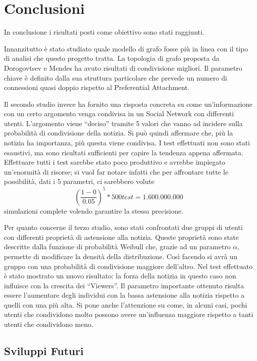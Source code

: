 \section{Conclusioni}
\label{section:conclusioni}

In conclusione i risultati posti come obiettivo sono stati raggiunti.

Innanzitutto è stato studiato quale modello di grafo fosse più in linea con il tipo di 
analisi che questo progetto tratta.
La topologia di grafo proposta da Dorogovtsev e Mendes ha avuto risultati di condivisione migliori. 
Il parametro chiave è definito dalla sua struttura particolare che 
prevede un numero di connessioni quasi doppio rispetto al Preferential Attachment.

Il secondo studio invece ha fornito una risposta concreta su come un'informazione con un certo argomento 
venga condivisa in un Social Network con differenti utenti.
L'argomento viene ``deciso'' tramite 5 valori che vanno ad incidere sulla probabilità di condivisione della notizia.
Si può quindi affermare che, più la notizia ha importanza, più questa viene condivisa.
I test effettuati non sono stati esaustivi, ma sono risultati sufficienti per capire la tendenza appena affermata.
Effettuare tutti i test sarebbe stato poco produttivo e avrebbe impiegato un'enormità di risorse;
si vuol far notare infatti che per affrontare tutte le possibilità, dati i 5 parametri, ci sarebbero volute
\[
  \left(\frac{1 - 0}{0.05}\right)^5 * 500 test = 1.600.000.000
\]
simulazioni complete volendo garantire la stessa precisione. 

Per quanto concerne il terzo studio, sono stati confrontati due gruppi di utenti con differenti 
proprietà di astensione alla notizia. Queste proprietà sono state descritte dalla funzione di probabilità 
Weibull che, grazie ad un parametro $\alpha$, permette di modificare la densità della distribuzione.
Così facendo si avrà un gruppo con una probabilità di condivisione maggiore dell'altro.
Nel test effettuato è stato mostrato un nuovo risultato: 
la forza della notizia in questo caso non influisce con la crescita dei ``Viewers''.
Il parametro importante ottenuto risulta essere l'aumentare degli individui con la bassa astensione alla 
notizia rispetto a quelli con una più alta.
Si pone anche l'attenzione su come, in alcuni casi, pochi utenti che condividono molto possono avere un'influenza 
maggiore rispetto a tanti utenti che condividono meno.


\subsection{Sviluppi Futuri}

